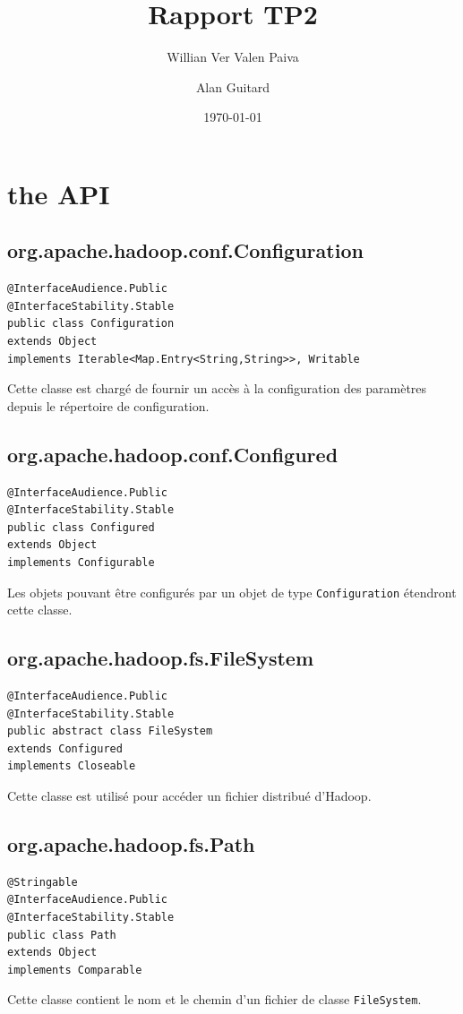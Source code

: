 \documentclass[a4paper]{article}
\author{Willian Ver Valen Paiva \and Alan Guitard}
\date{\today}
\title{Rapport TP2}
\begin{document}
\maketitle

\tableofcontents

\label{sec:orgheadline14}
\section{the API}
\label{sec:orgheadline8}
\subsection{org.apache.hadoop.conf.Configuration}
\begin{lstlisting}
@InterfaceAudience.Public
@InterfaceStability.Stable
public class Configuration
extends Object
implements Iterable<Map.Entry<String,String>>, Writable
\end{lstlisting}
\label{sec:orgheadline1}
Cette classe est chargé de fournir un accès à la configuration des paramètres depuis le répertoire de configuration.

\subsection{org.apache.hadoop.conf.Configured}
\label{sec:orgheadline2}

\begin{lstlisting}
@InterfaceAudience.Public
@InterfaceStability.Stable
public class Configured
extends Object
implements Configurable
\end{lstlisting}
Les objets pouvant être configurés par un objet de type \verb?Configuration? étendront cette classe.
\subsection{org.apache.hadoop.fs.FileSystem}
\label{sec:orgheadline3}

\begin{lstlisting}
@InterfaceAudience.Public
@InterfaceStability.Stable
public abstract class FileSystem
extends Configured
implements Closeable
\end{lstlisting}
Cette classe est utilisé pour accéder un fichier distribué d'Hadoop.
\subsection{org.apache.hadoop.fs.Path}
\label{sec:orgheadline4}
\begin{lstlisting}
@Stringable
@InterfaceAudience.Public
@InterfaceStability.Stable
public class Path
extends Object
implements Comparable
\end{lstlisting}
Cette classe contient le nom et le chemin d'un fichier de classe \verb?FileSystem?.
\end{document}

